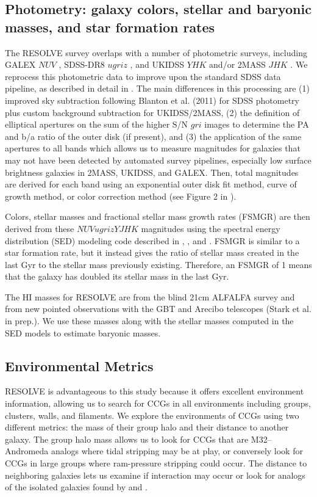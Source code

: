 \documentclass[iop,apj]{emulateapj}
\begin{document}
\subsection{Photometry: galaxy colors, stellar and baryonic masses, and star formation rates}
\label{phot}
\noindent The RESOLVE survey overlaps with a number of photometric surveys, including GALEX $NUV$ \citep{Morrissey2007}, SDSS-DR8 $ugriz$ \citep{Aihara2011}, and UKIDSS $YHK$ and/or 2MASS $JHK$ \citep{Skrutskie2006}. We reprocess this photometric data to improve upon the standard SDSS data pipeline, as described in detail in \citet{Eckert2015}. The main differences in this processing are (1) improved sky subtraction following Blanton et al. (2011) for SDSS photometry plus custom background subtraction for UKIDSS/2MASS, (2) the definition of elliptical apertures on the sum of the higher S/N $gri$ images to determine the PA and b/a ratio of the outer disk (if present), and (3) the application of the same apertures to all bands which allows us to measure magnitudes for galaxies that may not have been detected by automated survey pipelines, especially low surface brightness galaxies in 2MASS, UKIDSS, and GALEX. Then, total magnitudes are derived for each band using an exponential outer disk fit method, curve of growth method, or color correction method (see Figure 2 in \citet{Eckert2015}). 

Colors, stellar masses and fractional stellar mass growth rates (FSMGR) are then derived from these $NUVugrizYJHK$ magnitudes using the spectral energy distribution (SED) modeling code described in \citet{Kannappan2007}, \citet{Kannappan2009}, and \citet{Kannappan2013}. FSMGR is similar to a star formation rate, but it instead gives the ratio of stellar mass created in the last Gyr to the stellar mass previously existing. Therefore, an FSMGR of 1 means that the galaxy has doubled its stellar mass in the last Gyr.

The HI masses for RESOLVE are from the blind 21cm ALFALFA survey \citep{Haynes2011} and from new pointed observations with the GBT and Arecibo telescopes (Stark et al. in prep.). We use these masses along with the stellar masses computed in the SED models to estimate baryonic masses.

\subsection{Environmental Metrics}
\label{env}
\noindent RESOLVE is advantageous to this study because it offers excellent environment information, allowing us to search for CCGs in all environments including groups, clusters, walls, and filaments. We explore the environments of CCGs using two different metrics: the mass of their group halo and their distance to another galaxy. The group halo mass allows us to look for CCGs that are M32--Andromeda analogs where tidal stripping may be at play, or conversely look for CCGs in large groups where ram-pressure stripping could occur. The distance to neighboring galaxies lets us examine if interaction may occur or look for analogs of the isolated galaxies found by \citet{Huxor2013} and \citet{Paudel2014}.
\end{document}

